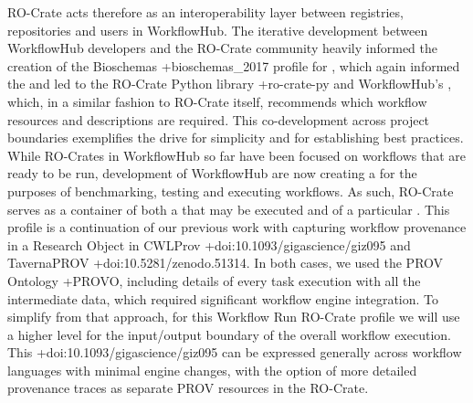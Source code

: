 {}RO-Crate acts therefore as an interoperability layer between registries, repositories and users in WorkflowHub. The iterative development between WorkflowHub developers and the RO-Crate community heavily informed the creation of the Bioschemas +{}{}{bioschemas_2017} profile for , which again informed the  and led to the RO-Crate Python library +{}{}{ro-crate-py} and WorkflowHub’s , which, in a similar fashion to RO-Crate itself, recommends which workflow resources and descriptions are required. This co-development across project boundaries exemplifies the drive for simplicity and for establishing best practices.\markdownRendererInterblockSeparator
{}\markdownRendererInterblockSeparator
{}While RO-Crates in WorkflowHub so far have been focused on workflows that are ready to be run, development of WorkflowHub are now creating a  for the purposes of benchmarking, testing and executing workflows. As such, RO-Crate serves as a container of both a  that may be executed and of a particular . This profile is a continuation of our previous work with capturing workflow provenance in a Research Object in CWLProv +{}{}{doi:10.1093/gigascience/giz095} and TavernaPROV +{}{}{doi:10.5281/zenodo.51314}. In both cases, we used the PROV Ontology +{}{}{PROVO}, including details of every task execution with all the intermediate data, which required significant workflow engine integration. To simplify from that approach, for this Workflow Run RO-Crate profile we will use a higher level  for the input/output boundary of the overall workflow execution. This  +{}{}{doi:10.1093/gigascience/giz095} can be expressed generally across workflow languages with minimal engine changes, with the option of more detailed provenance traces as separate PROV resources in the RO-Crate. \markdownRendererInterblockSeparator
